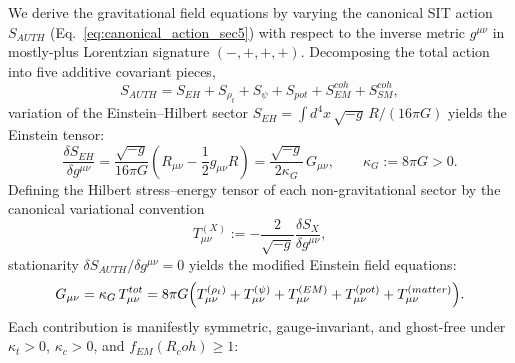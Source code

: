 \documentclass[american,11pt,letterpaper]{article}
\newcommand{\Rcoh}{R_{\mathrm{coh}}}
\def\mathrm#1{#1}%
\def\Rcoh{R_coh}%
\begin{document}
We derive the gravitational field equations by varying the canonical SIT action $S_{\mathrm{AUTH}}$ (Eq.~\eqref{eq:canonical_action_sec5}) with respect to the inverse metric $g^{\mu\nu}$ in mostly-plus Lorentzian signature $(-,+,+,+)$. Decomposing the total action into five additive covariant pieces,
\begin{equation}
S_{\mathrm{AUTH}} = S_{\mathrm{EH}} + S_{\rho_t} + S_{\psi} + S_{\mathrm{pot}} + S_{\mathrm{EM}}^{\mathrm{coh}} + S_{\mathrm{SM}}^{\mathrm{coh}},
\label{eq:action_sector_split}
\end{equation}
variation of the Einstein--Hilbert sector $S_{\mathrm{EH}} = \int d^4x\,\sqrt{-g}\,R/(16\pi G)$ yields the Einstein tensor:
\begin{equation}
\frac{\delta S_{\mathrm{EH}}}{\delta g^{\mu\nu}}
= \frac{\sqrt{-g}}{16\pi G}\left(R_{\mu\nu} - \frac{1}{2}g_{\mu\nu}R\right)
= \frac{\sqrt{-g}}{2\kappa_G}\,G_{\mu\nu},
\qquad
\kappa_G := 8\pi G > 0.
\label{eq:eh_variation}
\end{equation}
Defining the Hilbert stress--energy tensor of each non-gravitational sector by the canonical variational convention
\[
T_{\mu\nu}^{(X)} := -\frac{2}{\sqrt{-g}}\frac{\delta S_X}{\delta g^{\mu\nu}},
\]
stationarity $\delta S_{\mathrm{AUTH}} / \delta g^{\mu\nu} = 0$ yields the modified Einstein field equations:
\begin{equation}
G_{\mu\nu}
= \kappa_G\,T_{\mu\nu}^{\mathrm{tot}}
= 8\pi G\Bigl(
  T_{\mu\nu}^{(\rho_t)}
  + T_{\mu\nu}^{(\psi)}
  + T_{\mu\nu}^{(\mathrm{EM})}
  + T_{\mu\nu}^{(\mathrm{pot})}
  + T_{\mu\nu}^{(\mathrm{matter})}
\Bigr).
\label{eq:Einstein-like}
\end{equation}
Each contribution is manifestly symmetric, gauge-invariant, and ghost-free under $\kappa_t > 0$, $\kappa_c > 0$, and $f_{\mathrm{EM}}(\Rcoh) \ge 1$:
\end{document}
